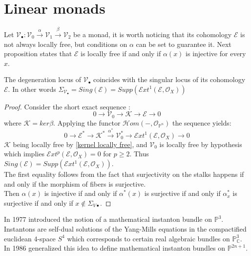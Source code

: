 \documentclass[
	oldfontcommands,
	sumario=abnt-6027-2012,
	12pt,			%
	openright,		%
	oneside,		%
	a4paper,		%
	english,		%
	brazil			%
	]{imecc-unicamp}
\begin{document}
\section{Linear monads}
Let $\mathcal{V}_\bullet: \mathcal{V}_0 \overset{\alpha}{\to} \mathcal{V}_1 \overset{\beta}{\to} \mathcal{V}_2$ be a monad, it is worth noticing that its cohomology $\mathcal{E}$ is not always locally free, but conditions on $\alpha$ can be set to guarantee it.
Next proposition states that $\mathcal{E}$ is locally free if and only if $\alpha (x)$ is injective for every $x$.
\begin{proposition}
The degeneration locus of $\mathcal{V}_\bullet$ coincides with the singular locus of its cohomology $\mathcal{E}$. In other words $\Sigma_{\mathcal{V}_\bullet} = Sing(\mathcal{E}) = Supp(\mathcal{E}xt^1(\mathcal{E},\mathcal{O}_X))$
\end{proposition}
\begin{proof}
Consider the short exact sequence :
\begin{equation}
0 \to \mathcal{V}_0 \to \mathcal{K} \to \mathcal{E} \to 0
\end{equation}
where $\mathcal{K} = ker \beta$. Applying the functor $\mathcal{H}om(-,\mathcal{O}_{\mathbb{P}^n})$ the sequence yields:
\begin{equation}
0 \to \mathcal{E}^* \to \mathcal{K}^* \overset{\alpha^*}{\to} \mathcal{V}_0^* \to \mathcal{E}xt^1(\mathcal{E},\mathcal{O}_X) \to 0
\end{equation}
$\mathcal{K}$ being locally free by \ref{kernel locally free}, and $\mathcal{V}_0$ is locally free by hypothesis which implies $\mathcal{E}xt^p(\mathcal{E},\mathcal{O}_X)=0$ for $p \geq 2$. Thus $Sing(\mathcal{E}) = Supp(\mathcal{E}xt^1(\mathcal{E}, \mathcal{O}_X))$. \\
The first equality follows from the fact that surjectivity on the stalks happens if and only if the morphism of fibers is surjective. \\
Then $\alpha (x)$ is injective if and only if $\alpha^* (x)$ is surjective if and only if $\alpha^*_x$ is surjective if and only if $x \not\in \Sigma_{V\bullet}$.
\end{proof}

In 1977 \cite[Atiyah, Hitchin, Drinfeld \& Manin]{ATIYAH1978185} introduced the notion of a mathematical instanton bundle on $\mathbb{P}^3$. Instantons are self-dual solutions of the Yang-Mills equations in the compactified euclidean 4-space $S^4$ which corresponds to certain real algebraic bundles on $\mathbb{P}^3_{\mathbb{C}}$.
In 1986 \cite[Okonek \& Spindler]{Spindler} generalized this idea to define mathematical instanton bundles on $\mathbb{P}^{2n+1}$.
\end{document}
